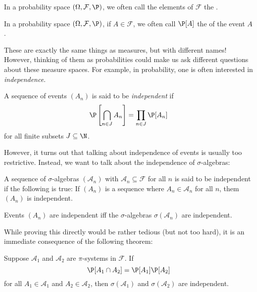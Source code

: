 \documentclass[a4paper]{article}
\begin{document}
\begin{defi}[Events]
  In a probability space $(\Omega, \mathcal{F}, \P)$, we often call the elements of $\mathcal{F}$ the .
\end{defi}

\begin{defi}[Probaiblity]
  In a probability space $(\Omega, \mathcal{F}, \P)$, if $A \in \mathcal{F}$, we often call $\P[A]$ the  of the event $A$.
\end{defi}

These are exactly the same things as measures, but with different names! However, thinking of them as probabilities could make us ask different questions about these measure spaces. For example, in probability, one is often interested in \emph{independence}.

\begin{defi}
  A sequence of events $(A_n)$ is said to be \emph{independent} if
  \[
    \P\left[\bigcap_{n \in J} A_n\right] = \prod_{n \in J} \P[A_n]
  \]
  for all finite subsets $J \subseteq \N$.
\end{defi}

However, it turns out that talking about independence of events is usually too restrictive. Instead, we want to talk about the independence of $\sigma$-algebras:

\begin{defi}
  A sequence of $\sigma$-algebras $(\mathcal{A}_n)$ with $\mathcal{A}_n \subseteq \mathcal{F}$ for all $n$ is said to be independent if the following is true: If $(A_n)$ is a sequence where $A_n \in \mathcal{A}_n$ for all $n$, them $(A_n)$ is independent.
\end{defi}

\begin{prop}
  Events $(A_n)$ are independent iff the $\sigma$-algebras $\sigma(\mathcal{A}_n)$ are independent.
\end{prop}
While proving this directly would be rather tedious (but not too hard), it is an immediate consequence of the following theorem:

\begin{thm}
  Suppose $\mathcal{A}_1$ and $\mathcal{A}_2$ are $\pi$-systems in $\mathcal{F}$. If
  \[
    \P[A_1 \cap A_2] = \P[A_1] \P[A_2]
  \]
  for all $A_1 \in \mathcal{A}_1$ and $A_2 \in \mathcal{A}_2$, then $\sigma(\mathcal{A}_1)$ and $\sigma(\mathcal{A}_2)$ are independent.
\end{thm}
\end{document}

